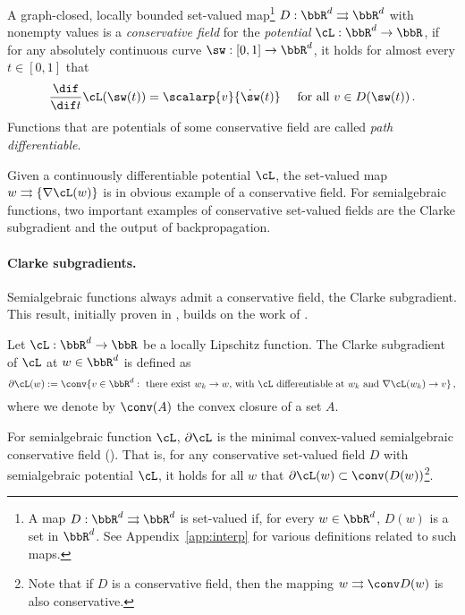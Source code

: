 \begin{definition}\label{def:cons_f}
  A graph-closed, locally bounded set-valued map\footnote{A map $D: \bbR^d \rightrightarrows \bbR^d$ is set-valued if, for every $w \in \bbR^d$, $D(w)$ is a set in $\bbR^d$. See Appendix~\ref{app:interp} for various definitions related to such maps.} $D: \bbR^d \rightrightarrows \bbR^d$ with nonempty values is a \emph{conservative field} for the \emph{potential} $\cL: \bbR^d \rightarrow \bbR$, if for any absolutely continuous curve $\sw: [0, 1] \rightarrow \bbR^d$, it holds for almost every $t \in [0,1]$ that 
  \begin{equation*}
    \frac{\dif}{\dif t} \cL(\sw(t)) = \scalarp{v}{\dot{\sw}(t)} \quad \textrm{ for all $v \in D(\sw(t))$} \, .
  \end{equation*} 
  Functions that are potentials of some conservative field are called \emph{path differentiable}.
\end{definition}
Given a continuously differentiable potential $\cL$, the set-valued map $w \rightrightarrows \{ \nabla \cL(w)\}$ is in obvious example of a conservative field. 
For semialgebraic functions, two important examples of conservative set-valued fields are the Clarke subgradient and the output of backpropagation.

\paragraph{Clarke subgradients.}
Semialgebraic functions always admit a conservative field, the Clarke subgradient. This result, initially proven in \cite{drusvyatskiy2015curves}, builds on the work of \cite{bolte2007clarke}.

\begin{definition}
  Let $\cL: \bbR^d \rightarrow \bbR$ be a locally Lipschitz function. The Clarke subgradient of $\cL$ at $w \in\bbR^d$ is defined as
  \begin{equation}\label{eq:def_clarke}
    \partial \cL(w) := \conv \{ v \in \bbR^d: \textrm{ there exist $w_k \rightarrow w$, with $\cL$ differentiable at $w_k$ and $\nabla \cL(w_k) \rightarrow v$}\}\, ,
  \end{equation}
  where we denote by $\conv(A)$ the convex closure of a set $A$.
\end{definition}
For semialgebraic function $\cL$, $\partial \cL$ is the minimal convex-valued semialgebraic conservative field (\cite{drusvyatskiy2015curves, bolte2021conservative}). That is, for any conservative set-valued field $D$ with semialgebraic potential $\cL$, it holds for all $w$ that $\partial \cL(w) \subset \conv(D(w))$\footnote{Note that if $D$ is a conservative field, then the mapping $w \rightrightarrows \conv D(w)$ is also conservative.}. 

